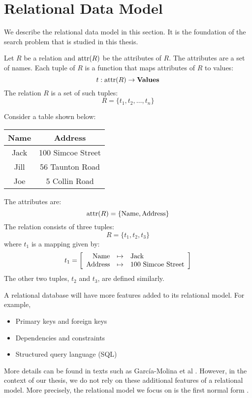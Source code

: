 \section{Relational Data Model}
We describe the relational data model in this section. It is the foundation of the search problem that is studied in this thesis.  

Let $R$ be a relation and $\operatorname{attr}(R)$ be the attributes of $R$. The attributes are a set of names.  Each tuple of $R$ is
a function that maps attributes of $R$ to values:
$$
t : \operatorname{attr}(R) \to \mathbf{Values}
$$
The relation $R$ is a set of such tuples:
$$
R = \{t_1, t_2, \dots, t_n\}
$$

\begin{example}
Consider a table shown below:
\begin{center}
    \centering
    \begin{tabular}{|c|c|}\hline
    {\bf Name} & {\bf Address} \\ \hline
    Jack & 100 Simcoe Street \\ \hline
    Jill & 56 Taunton Road \\ \hline
    Joe & 5 Collin Road \\ \hline
    \end{tabular}
\end{center}
The attributes are:
$$ \operatorname{attr}(R) = \{\mathrm{Name}, \mathrm{Address}\} $$
The relation consists of three tuples:
$$ R = \{t_1, t_2, t_3\} $$
where $t_1$ is a mapping given by:
$$
t_1 = \left[\begin{array}{rcl}
\mathrm{Name} & \mapsto & \makebox{Jack} \\
\mathrm{Address} & \mapsto & \makebox{100 Simcoe Street} \\
\end{array}\right]
$$
The other two tuples, $t_2$ and $t_3$, are defined similarly.
\end{example}

A relational database will have more features added to its relational model. For example,
\begin{itemize}
    \item Primary keys and foreign keys
    \item Dependencies and constraints
    \item Structured query language (SQL)
\end{itemize}
More details can be found in texts such as García-Molina et al  \cite{garcia2005database}.  However, in the context of our thesis, we do not rely on these additional features of a relational model.  More precisely, the relational model we focus on is the first normal form \cite{beeri1979computational}.

